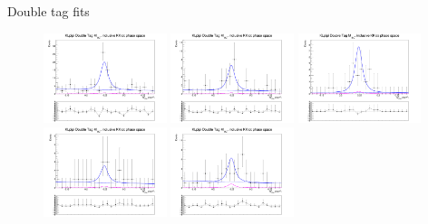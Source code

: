 \documentclass{beamer}
\begin{document}
\begin{frame}{Double tag fits}
  \begin{figure}
    \centering
    \includegraphics[width=0.32\textwidth, clip = true, trim = {0 11cm 0 0}]{Plots/DoubleTagYield_DoubleTag_SCMB_KKpipi_vs_KLpipi_SignalBin0_TagBin1.png}
    \includegraphics[width=0.32\textwidth, clip = true, trim = {0 11cm 0 0}]{Plots/DoubleTagYield_DoubleTag_SCMB_KKpipi_vs_KLpipi_SignalBin0_TagBin2.png}
    \includegraphics[width=0.32\textwidth, clip = true, trim = {0 11cm 0 0}]{Plots/DoubleTagYield_DoubleTag_SCMB_KKpipi_vs_KLpipi_SignalBin0_TagBin3.png}
    \includegraphics[width=0.32\textwidth, clip = true, trim = {0 11cm 0 0}]{Plots/DoubleTagYield_DoubleTag_SCMB_KKpipi_vs_KLpipi_SignalBin0_TagBin4.png}
    \includegraphics[width=0.32\textwidth, clip = true, trim = {0 11cm 0 0}]{Plots/DoubleTagYield_DoubleTag_SCMB_KKpipi_vs_KLpipi_SignalBin0_TagBin5.png}

\end{figure}
\end{frame}
\end{document}
